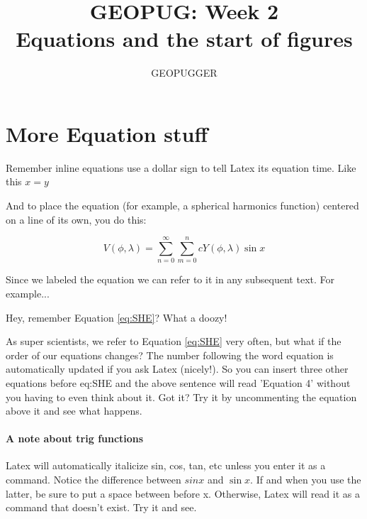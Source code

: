 \documentclass[12pt]{article} %
\date{} %
\title{GEOPUG: Week 2\\Equations and the start of figures} %
\author{GEOPUGGER}
\begin{document}
\maketitle
\section{More Equation stuff}
Remember inline equations use a dollar sign to tell Latex its equation time.  Like this $x=y$


And to place the equation (for example, a spherical harmonics function) centered on a line of its own, you do this:

\begin{equation}
V(\phi,\lambda)=\sum_{n=0}^{\infty}\sum_{m=0}^ncY(\phi,\lambda)\sin x
\label{eq:SHE} %
\end{equation}

Since we labeled the equation we can refer to it in any subsequent text.  For example...

\begin{center}
Hey, remember Equation \ref{eq:SHE}?  What a doozy!
\end{center}

As super scientists, we refer to Equation \ref{eq:SHE} very often, but what if the order of our equations changes?  The number following the word equation is automatically updated if you ask Latex (nicely!).  So you can insert three other equations before eq:SHE and the above sentence will read 'Equation 4' without you having to even think about it.  Got it?  Try it by uncommenting the equation above it and see what happens.

\paragraph{A note about trig functions}
Latex will automatically italicize sin, cos, tan, etc unless you enter it as a command.  Notice the difference between $sinx$ and $\sin x$.  If and when you use the latter, be sure to put a space between before x.  Otherwise, Latex will read it as a command that doesn't exist.  Try it and see.
\end{document}
